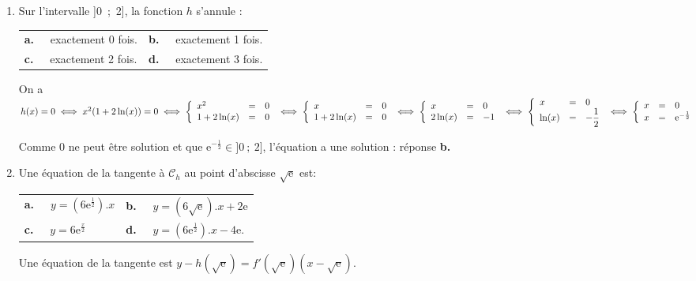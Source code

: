 \documentclass[10pt]{article}
\begin{document}
\begin{enumerate}[resume]
\item Sur l'intervalle ]0~;~2], la fonction $h$ s'annule :

\begin{center}
\begin{tabularx}{\linewidth}{*{2}{X}}
\textbf{a.~~} exactement 0 fois. &\textbf{b.~~} exactement 1 fois.\\
\textbf{c.~~} exactement 2 fois. &\textbf{d.~~} exactement 3 fois.
\end{tabularx}
\end{center}
On a $h(x) = 0 \iff x^2(1 + 2\ln (x)) = 0 \iff \left\{\begin{array}{l c l}
x^2 &=&0\\
1 + 2\ln (x)&=&0
\end{array}\right. \iff \left\{\begin{array}{l c l}
x &=&0\\
1 + 2\ln (x)&=&0
\end{array}\right. \iff \left\{\begin{array}{l c l}
x &=&0\\
2\ln (x)&=&- 1
\end{array}\right. \iff \left\{\begin{array}{l c l}
x &=&0\\
\ln (x)&=&- \dfrac{1}{2}\end{array}\right.\iff \left\{\begin{array}{l c l}
x &=&0\\
x&=&\text{e}^{- \frac{1}{2}}\end{array}\right.$

Comme 0 ne peut être solution et que $\text{e}^{- \frac{1}{2}} \in ]0~;~2]$, l'équation a une solution : réponse \textbf{b.}
\item Une équation de la tangente à $\mathcal{C}_h$ au point d'abscisse $\sqrt{\text{e}}$ est:

\begin{center}
\begin{tabularx}{\linewidth}{*{2}{X}}
\textbf{a.~~} $y = \left(6\text{e}^{\frac12}\right).{} x $&
\textbf{b.~~} $y = \left(6\sqrt{\text{e}}\right).{} x + 2\text{e}$\\
\textbf{c.~~} $y = 6\text{e}^{\frac{x}{2}}$
&\textbf{d.~~} $y = \left(6\text{e}^{\frac12}\right) .{} x - 4\text{e}$.
\end{tabularx}
\end{center}
Une équation de la tangente est $y - h\left(\sqrt{\text{e}}\right) = f'\left(\sqrt{\text{e}}\right)\left(x - \sqrt{\text{e}}\right)$.


\end{enumerate}
\end{document}
